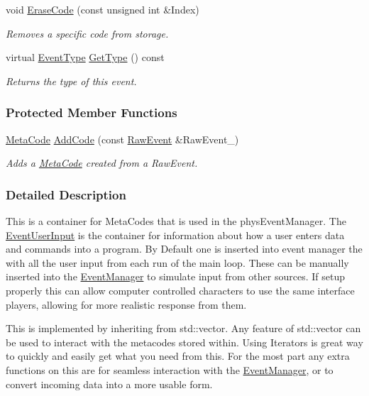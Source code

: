 \begin{DoxyCompactItemize}
void \hyperlink{classphys_1_1EventUserInput_a583084578443019d6e286b8f0e02ce58}{EraseCode} (const unsigned int \&Index)
\begin{DoxyCompactList}\small\item\em Removes a specific code from storage. \item\end{DoxyCompactList}\item 
virtual \hyperlink{classphys_1_1EventBase_a5e6a8564e127f654123f0bf6a2751923}{EventType} \hyperlink{classphys_1_1EventUserInput_a3e803a8d9bcc1576fe04d2245a86ec80}{GetType} () const 
\begin{DoxyCompactList}\small\item\em Returns the type of this event. \item\end{DoxyCompactList}\end{DoxyCompactItemize}
\subsubsection*{Protected Member Functions}
\begin{DoxyCompactItemize}
\item 
\hyperlink{classphys_1_1MetaCode}{MetaCode} \hyperlink{classphys_1_1EventUserInput_a1dd4a5a8021fd0e36fa394d0132e8f2c}{AddCode} (const \hyperlink{namespacephys_a8126d26e4507e66d09876988bb941fd4}{RawEvent} \&RawEvent\_\-)
\begin{DoxyCompactList}\small\item\em Adds a \hyperlink{classphys_1_1MetaCode}{MetaCode} created from a RawEvent. \item\end{DoxyCompactList}\end{DoxyCompactItemize}


\subsubsection{Detailed Description}
This is a container for MetaCodes that is used in the physEventManager. The \hyperlink{classphys_1_1EventUserInput}{EventUserInput} is the container for information about how a user enters data and commands into a program. By Default one is inserted into event manager the with all the user input from each run of the main loop. These can be manually inserted into the \hyperlink{classphys_1_1EventManager}{EventManager} to simulate input from other sources. If setup properly this can allow computer controlled characters to use the same interface players, allowing for more realistic response from them. \par
 \par
 This is implemented by inheriting from std::vector. Any feature of std::vector can be used to interact with the metacodes stored within. Using Iterators is great way to quickly and easily get what you need from this. For the most part any extra functions on this are for seamless interaction with the \hyperlink{classphys_1_1EventManager}{EventManager}, or to convert incoming data into a more usable form. 

